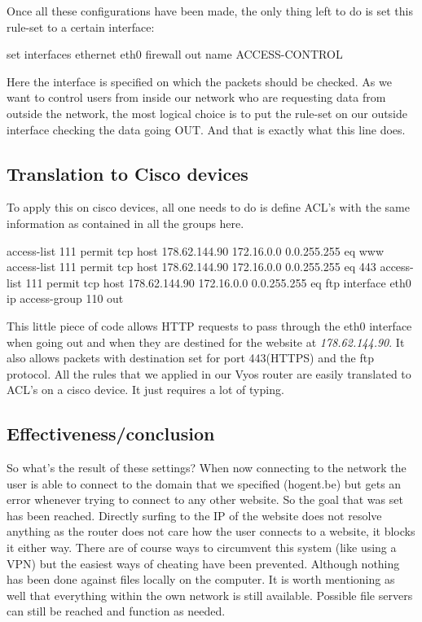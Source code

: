 Once all these configurations have been made, the only thing left to do is set this rule-set to a certain interface:
\begin{cisco}[title=Assigning the rule-set]
set interfaces ethernet eth0 firewall out name ACCESS-CONTROL
\end{cisco}
Here the interface is specified on which the packets should be checked. As we want to control users from inside our network who are requesting data from outside the network, the most logical choice is to put the rule-set on our outside interface checking the data going OUT. And that is exactly what this line does.
\subsection{Translation to Cisco devices}
To apply this on cisco devices, all one needs to do is define ACL's with the same information as contained in all the groups here. 
\begin{cisco}
access-list 111 permit tcp host 178.62.144.90 172.16.0.0 0.0.255.255 eq www
access-list 111 permit tcp host 178.62.144.90 172.16.0.0 0.0.255.255 eq 443
access-list 111 permit tcp host 178.62.144.90 172.16.0.0 0.0.255.255 eq ftp
interface eth0
ip access-group 110 out
\end{cisco}
This little piece of code allows HTTP requests to pass through the eth0 interface when going out and when they are destined for the website at \textit{178.62.144.90}.  It also allows packets with destination set for port 443(HTTPS) and the ftp protocol. All the rules that we applied in our Vyos router are easily translated to ACL's on a cisco device. It just requires a lot of typing.
\subsection{Effectiveness/conclusion}
So what's the result of these settings? When now connecting to the network the user is able to connect to the domain that we specified (hogent.be) but gets an error whenever trying to connect to any other website. So the goal that was set has been reached. Directly surfing to the IP of the website does not resolve anything as the router does not care how the user connects to a website, it blocks it either way. There are of course ways to circumvent this system (like using a VPN) but the easiest ways of cheating have been prevented. Although nothing has been done against files locally on the computer. It is worth mentioning as well that everything within the own network is still available. Possible file servers can still be reached and function as needed.
